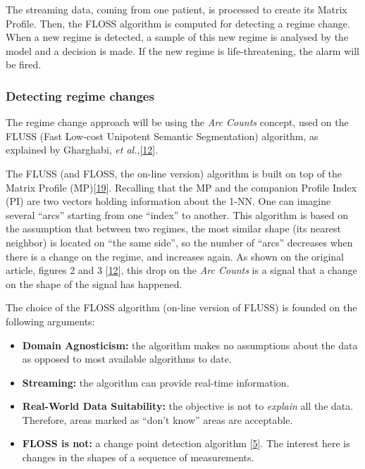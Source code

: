\documentclass[runningheads]{llncs}
\providecommand{\tightlist}{%
  \setlength{\itemsep}{0pt}\setlength{\parskip}{0pt}}
\begin{document}
The streaming data, coming from one patient, is processed to create its Matrix Profile. Then, the
FLOSS algorithm is computed for detecting a regime change. When a new regime is detected, a sample
of this new regime is analysed by the model and a decision is made. If the new regime is
life-threatening, the alarm will be fired.

\hypertarget{detecting-regime-changes}{%
\subsubsection{Detecting regime changes}\label{detecting-regime-changes}}

The regime change approach will be using the \emph{Arc Counts} concept, used on the FLUSS (Fast Low-cost
Unipotent Semantic Segmentation) algorithm, as explained by Gharghabi, \emph{et al.},{[}\protect\hyperlink{ref-gharghabi2018}{12}{]}.

The FLUSS (and FLOSS, the on-line version) algorithm is built on top of the Matrix Profile
(MP){[}\protect\hyperlink{ref-Yeh2017a}{19}{]}. Recalling that the MP and the companion Profile Index (PI) are two vectors holding
information about the 1-NN. One can imagine several ``arcs'' starting from one ``index'' to another.
This algorithm is based on the assumption that between two regimes, the most similar shape (its
nearest neighbor) is located on ``the same side'', so the number of ``arcs'' decreases when there is a
change on the regime, and increases again. As shown on the original article, figures 2 and 3
{[}\protect\hyperlink{ref-gharghabi2018}{12}{]}, this drop on the \emph{Arc Counts} is a signal that a change on the shape of the signal
has happened.

The choice of the FLOSS algorithm (on-line version of FLUSS) is founded on the following arguments:

\begin{itemize}
\tightlist
\item
  \textbf{Domain Agnosticism:} the algorithm makes no assumptions about the data as opposed to most
  available algorithms to date.
\item
  \textbf{Streaming:} the algorithm can provide real-time information.
\item
  \textbf{Real-World Data Suitability:} the objective is not to \emph{explain} all the data. Therefore, areas
  marked as ``don't know'' areas are acceptable.
\item
  \textbf{FLOSS is not:} a change point detection algorithm {[}\protect\hyperlink{ref-aminikhanghahi2016}{5}{]}. The interest here is
  changes in the shapes of a sequence of measurements.
\end{itemize}
\end{document}

